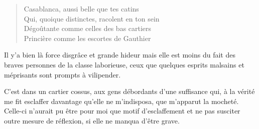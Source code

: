 \begin{verse}
Casablanca, aussi belle que tes catins\\
Qui, quoique distinctes, racolent en ton sein\\
Dégoûtante comme celles des bas cartiers\\
Princière comme les escortes de Gauthier
\end{verse}

\begin{prose}
Il y’a bien là force disgrâce et grande hideur mais elle est moins du fait des braves personnes de la classe laborieuse, ceux que quelques esprits malsains et méprisants sont prompts à vilipender.

C’est dans un cartier cossus, aux gens débordants d’une suffisance qui, à la vérité me fit esclaffer davantage qu’elle ne m’indisposa, que m’apparut la mocheté. Celle-ci n’aurait pu être pour moi que motif d’esclaffement et ne pas susciter outre mesure de réflexion, si elle ne manqua d’être grave.
\end{prose}

